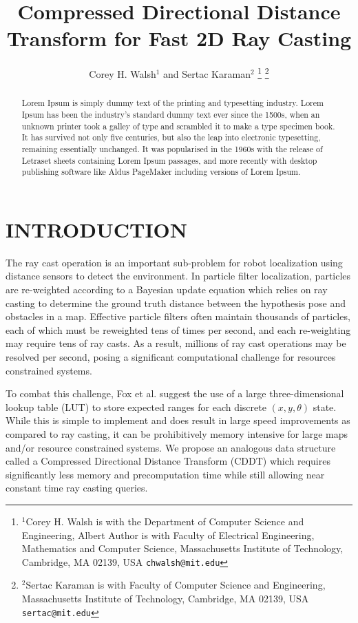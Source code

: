 \documentclass[letterpaper, 10 pt, conference]{ieeeconf}  %
\title{\LARGE \bf
Compressed Directional Distance Transform for Fast 2D Ray Casting
}
\author{Corey H. Walsh$^{1}$ and Sertac Karaman$^{2}$%
\thanks{$^{1}$Corey H. Walsh is with the Department of Computer Science and Engineering, 
Albert Author is with Faculty of Electrical Engineering, Mathematics and Computer Science, Massachusetts Institute of Technology,
        Cambridge, MA 02139, USA
        {\tt\small chwalsh@mit.edu}}%
\thanks{$^{2}$Sertac Karaman is with Faculty of Computer Science and Engineering, Massachusetts Institute of Technology,
        Cambridge, MA 02139, USA
        {\tt\small sertac@mit.edu}}%
}
\begin{document}
\maketitle
\thispagestyle{empty}
\pagestyle{empty}


\begin{abstract}


Lorem Ipsum is simply dummy text of the printing and typesetting industry. Lorem Ipsum has been the industry's standard dummy text ever since the 1500s, when an unknown printer took a galley of type and scrambled it to make a type specimen book. It has survived not only five centuries, but also the leap into electronic typesetting, remaining essentially unchanged. It was popularised in the 1960s with the release of Letraset sheets containing Lorem Ipsum passages, and more recently with desktop publishing software like Aldus PageMaker including versions of Lorem Ipsum.


\end{abstract}


\section{INTRODUCTION}

The ray cast operation is an important sub-problem for robot localization \cite{localization} using distance sensors to detect the environment. In particle filter localization, particles are re-weighted according to a Bayesian update equation which relies on ray casting to determine the ground truth distance between the hypothesis pose and obstacles in a map. Effective particle filters often maintain thousands of particles, each of which must be reweighted tens of times per second, and each re-weighting may require tens of ray casts. As a result, millions of ray cast operations may be resolved per second, posing a significant computational challenge for resources constrained systems.

To combat this challenge, Fox et al. \cite{localization} suggest the use of a large three-dimensional lookup table (LUT) to store expected ranges for each discrete $(x,y,\theta)$ state. While this is simple to implement and does result in large speed improvements as compared to ray casting, it can be prohibitively memory intensive for large maps and/or resource constrained systems. We propose an analogous data structure called a Compressed Directional Distance Transform (CDDT) which requires significantly less memory and precomputation time while still allowing near constant time ray casting queries.
\end{document}
